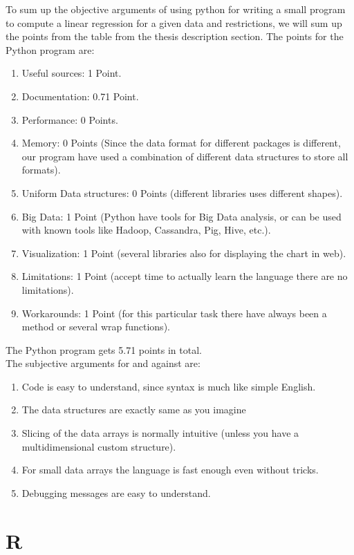 \documentclass{article}
\begin{document}
To sum up the objective arguments of using python for writing a small program to compute a linear regression for a given data and restrictions, we will sum up the points from the table from the thesis description section.
The points for the Python program are:
\begin{enumerate}
    \item Useful sources: 1 Point.
    \item Documentation: 0.71 Point.
    \item Performance: 0 Points.
    \item Memory: 0 Points (Since the data format for different packages is different, our program have used a combination of different data structures to store all formats).
    \item Uniform Data structures: 0 Points (different libraries uses different shapes).
    \item Big Data: 1 Point (Python have tools for Big Data analysis, or can be used with known tools like Hadoop, Cassandra, Pig, Hive, etc.).
    \item Visualization: 1 Point (several libraries also for displaying the chart in web).
    \item Limitations: 1 Point (accept time to actually learn the language there are no limitations).
    \item Workarounds: 1 Point (for this particular task there have always been a method or several wrap functions).
\end{enumerate} 
The Python program gets 5.71 points in total.\\
The subjective arguments for and against are: 
\begin{enumerate}
    \item Code is easy to understand, since syntax is much like simple English.
    \item The data structures are exactly same as you imagine
    \item Slicing of the data arrays is normally intuitive (unless you have a multidimensional custom structure).
    \item For small data arrays the language is fast enough even without tricks.
    \item Debugging messages are easy to understand.
\end{enumerate}  


\newpage
\section{R}
\end{document}
